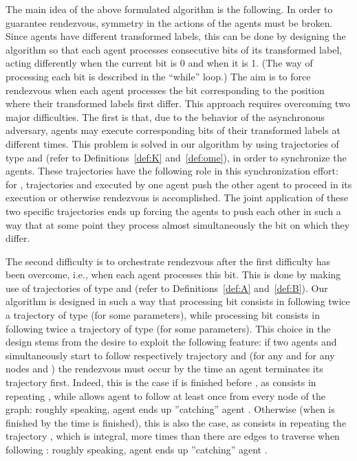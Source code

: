\documentclass [11pt] {article}
\begin{document}
{The main idea of the above formulated algorithm is the following. In order to guarantee rendezvous, symmetry in the actions of the agents must be broken.
 Since agents have different transformed labels, this can be done by designing the algorithm so that each agent processes consecutive bits of its transformed label, acting differently when the current bit is 0 and when it is 1.  (The way of processing each bit is described in the ``while'' loop.) The aim is to force rendezvous when each agent processes the bit corresponding to the position where their transformed labels {first} differ. This approach requires overcoming two major difficulties. The first is that, due to the behavior of the asynchronous adversary,
 agents may execute corresponding bits of their transformed labels at different times. This problem is solved in our algorithm by using trajectories of type  and  (refer to Definitions~\ref{def:K} and~\ref{def:ome}), in order to synchronize the agents. These trajectories have the following role in this synchronization effort: for , trajectories  and  executed by one agent push the other agent to proceed in its execution or otherwise rendezvous is accomplished. The joint application of these two specific trajectories {ends up forcing} the agents to push each other in such a way that at some point they process almost simultaneously the bit on which they differ.}

{ The second difficulty is to orchestrate rendezvous after the first difficulty has been overcome, i.e., when each agent 
 processes this bit. This is done by making use of trajectories of type  and  (refer to Definitions~\ref{def:A} and~\ref{def:B}). Our algorithm is designed in such a way that processing bit  consists in following twice a trajectory of type  (for some parameters), while processing bit  consists in following twice a trajectory of type  (for some parameters). This choice in the design stems from the desire to exploit the following feature: if two agents  and  simultaneously start to follow respectively trajectory  and  (for any  and for any nodes  and ) the rendezvous must occur by the time an agent terminates its trajectory first. Indeed, this is the case if  is finished before , as  consists in repeating , while  allows agent  to follow  at least once from every node  of the graph: roughly speaking, agent  ends up ''catching'' agent .
Otherwise (when  is finished by the time  is finished), this is also the case, as  consists in repeating the trajectory , which is integral, more times than there are edges to traverse when following : roughly speaking, agent  ends up ''catching'' agent .}
\end{document}
